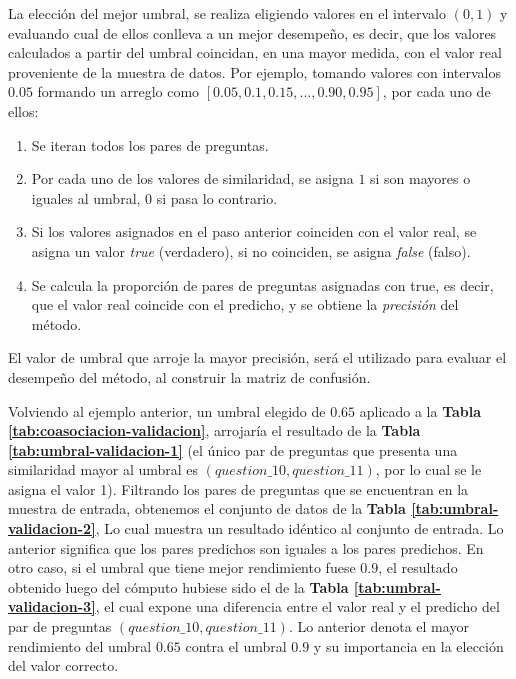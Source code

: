 La elección del mejor umbral, se realiza eligiendo valores en el intervalo \((0,1)\) y evaluando cual de ellos conlleva a un mejor desempeño, es decir, que los valores calculados a partir del umbral coincidan, en una mayor medida, con el valor real proveniente de la muestra de datos. Por ejemplo, tomando valores con intervalos \(0.05\) formando un arreglo como \([0.05, 0.1, 0.15, ..., 0.90, 0.95]\), por cada uno de ellos:
\begin{enumerate}
	\item Se iteran todos los pares de preguntas.
	\item Por cada uno de los valores de similaridad, se asigna \(1\) si son mayores o iguales al umbral, \(0\) si pasa lo contrario.
	\item Si los valores asignados en el paso anterior coinciden con el valor real, se asigna un valor \textit{true} (verdadero), si no coinciden, se asigna \textit{false} (falso).
	\item Se calcula la proporción de pares de preguntas asignadas con true, es decir, que el valor real coincide con el predicho, y se obtiene la \textit{precisión} del método.
\end{enumerate}
El valor de umbral que arroje la mayor precisión, será el utilizado para evaluar el desempeño del método, al construir la matriz de confusión.

\bigskip Volviendo al ejemplo anterior, un umbral elegido de \(0.65\) aplicado a la \textbf{Tabla \ref{tab:coasociacion-validacion}}, arrojaría el resultado de la \textbf{Tabla \ref{tab:umbral-validacion-1}} (el único par de preguntas que presenta una similaridad mayor al umbral es \((question\_10, question\_11)\), por lo cual se le asigna el valor 1). Filtrando los pares de preguntas que se encuentran en la muestra de entrada, obtenemos el conjunto de datos de la \textbf{Tabla \ref{tab:umbral-validacion-2}}, Lo cual muestra un resultado idéntico al conjunto de entrada. Lo anterior significa que los pares predichos son iguales a los pares predichos. En otro caso, si el umbral que tiene mejor rendimiento fuese \(0.9\), el resultado obtenido luego del cómputo hubiese sido el de la \textbf{Tabla \ref{tab:umbral-validacion-3}}, el cual expone una diferencia entre el valor real y el predicho del par de preguntas \((question\_10, question\_11)\). Lo anterior denota el mayor rendimiento del umbral \(0.65\) contra el umbral \(0.9\) y su importancia en la elección del valor correcto.

